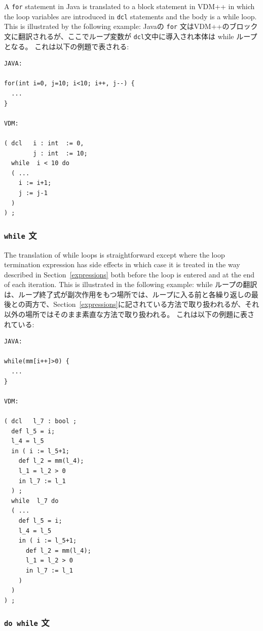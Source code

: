 \documentclass[\pformat,12pt]{jarticle}
\begin{document}
A \texttt{for} statement in Java is translated to a block statement in
VDM++ in which the loop variables are introduced in \texttt{dcl}
statements and the body is a while loop. This is illustrated by the
following example: 
Javaの \texttt{for} 文はVDM++のブロック文に翻訳されるが、ここでループ変数が \texttt{dcl}文中に導入され本体は while ループとなる。
これは以下の例題で表される: 

\begin{small}
\begin{verbatim}
JAVA:

for(int i=0, j=10; i<10; i++, j--) {
  ...
}

VDM:

( dcl   i : int  := 0,
        j : int  := 10;
  while  i < 10 do  
  ( ...
    i := i+1;
    j := j-1
  ) 
) ;
\end{verbatim}
\end{small}

\subsubsection{\texttt{while} 文}

The translation of while loops is straightforward except where the
loop termination expression has side effects in which case it is
treated in the way described in Section~\ref{expressions} both before
the loop is entered and at the end of each iteration. This is
illustrated in the following example:
while ループの翻訳は、ループ終了式が副次作用をもつ場所では、ループに入る前と各繰り返しの最後との両方で、Section~\ref{expressions}に記されている方法で取り扱われるが、それ以外の場所ではそのまま素直な方法で取り扱われる。
これは以下の例題に表されている:

\begin{small}
\begin{verbatim}
JAVA:

while(mm[i++]>0) {
  ...
}

VDM:

( dcl   l_7 : bool ;
  def l_5 = i;
  l_4 = l_5
  in ( i := l_5+1;
    def l_2 = mm(l_4);
    l_1 = l_2 > 0
    in l_7 := l_1
  ) ;
  while  l_7 do  
  ( ...
    def l_5 = i;
    l_4 = l_5
    in ( i := l_5+1;
      def l_2 = mm(l_4);
      l_1 = l_2 > 0
      in l_7 := l_1
    ) 
  ) 
) ;
\end{verbatim}
\end{small}

\subsubsection{\texttt{do while} 文}
\end{document}
